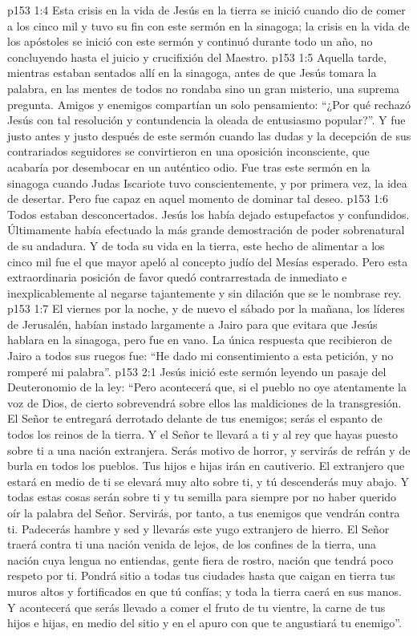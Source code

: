 \vs p153 1:4 \pc Esta crisis en la vida de Jesús en la tierra se inició cuando dio de comer a los cinco mil y tuvo su fin con este sermón en la sinagoga; la crisis en la vida de los apóstoles se inició con este sermón y continuó durante todo un año, no concluyendo hasta el juicio y crucifixión del Maestro.
\vs p153 1:5 \pc Aquella tarde, mientras estaban sentados allí en la sinagoga, antes de que Jesús tomara la palabra, en las mentes de todos no rondaba sino un gran misterio, una suprema pregunta. Amigos y enemigos compartían un solo pensamiento: “¿Por qué rechazó Jesús con tal resolución y contundencia la oleada de entusiasmo popular?”. Y fue justo antes y justo después de este sermón cuando las dudas y la decepción de sus contrariados seguidores se convirtieron en una oposición inconsciente, que acabaría por desembocar en un auténtico odio. Fue tras este sermón en la sinagoga cuando Judas Iscariote tuvo conscientemente, y por primera vez, la idea de desertar. Pero fue capaz en aquel momento de dominar tal deseo.
\vs p153 1:6 Todos estaban desconcertados. Jesús los había dejado estupefactos y confundidos. Últimamente había efectuado la más grande demostración de poder sobrenatural de su andadura. Y de toda su vida en la tierra, este hecho de alimentar a los cinco mil fue el que mayor apeló al concepto judío del Mesías esperado. Pero esta extraordinaria posición de favor quedó contrarrestada de inmediato e inexplicablemente al negarse tajantemente y sin dilación que se le nombrase rey.
\vs p153 1:7 El viernes por la noche, y de nuevo el sábado por la mañana, los líderes de Jerusalén, habían instado largamente a Jairo para que evitara que Jesús hablara en la sinagoga, pero fue en vano. La única respuesta que recibieron de Jairo a todos sus ruegos fue: “He dado mi consentimiento a esta petición, y no romperé mi palabra”.
\vs p153 2:1 Jesús inició este sermón leyendo un pasaje del Deuteronomio de la ley: “Pero acontecerá que, si el pueblo no oye atentamente la voz de Dios, de cierto sobrevendrá sobre ellos las maldiciones de la transgresión. El Señor te entregará derrotado delante de tus enemigos; serás el espanto de todos los reinos de la tierra. Y el Señor te llevará a ti y al rey que hayas puesto sobre ti a una nación extranjera. Serás motivo de horror, y servirás de refrán y de burla en todos los pueblos. Tus hijos e hijas irán en cautiverio. El extranjero que estará en medio de ti se elevará muy alto sobre ti, y tú descenderás muy abajo. Y todas estas cosas serán sobre ti y tu semilla para siempre por no haber querido oír la palabra del Señor. Servirás, por tanto, a tus enemigos que vendrán contra ti. Padecerás hambre y sed y llevarás este yugo extranjero de hierro. El Señor traerá contra ti una nación venida de lejos, de los confines de la tierra, una nación cuya lengua no entiendas, gente fiera de rostro, nación que tendrá poco respeto por ti. Pondrá sitio a todas tus ciudades hasta que caigan en tierra tus muros altos y fortificados en que tú confías; y toda la tierra caerá en sus manos. Y acontecerá que serás llevado a comer el fruto de tu vientre, la carne de tus hijos e hijas, en medio del sitio y en el apuro con que te angustiará tu enemigo”.
